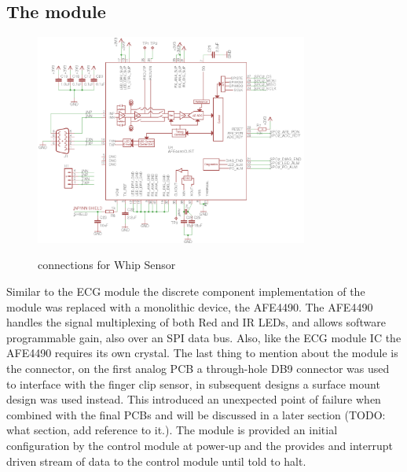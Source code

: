 \subsection{The  module}

\begin{figure}
	\begin{center}
		\label{fig:Rev5_SPO2}
		\includegraphics[scale=1,width=0.8\textwidth]{Images/Rev5_SPO2.png} 
		\caption{ connections for Whip Sensor}
	\end{center}
\end{figure}
Similar to the ECG module the discrete component implementation of the  module was replaced with a monolithic device, the AFE4490. The AFE4490 handles the signal multiplexing of both Red and IR LEDs, and allows software programmable gain, also over an SPI data bus. Also, like the ECG module IC the AFE4490 requires its own crystal. The last thing to mention about the  module is the connector, on the first analog PCB a through-hole DB9 connector was used to interface with the finger clip sensor, in subsequent designs a surface mount design was used instead. This introduced an unexpected point of failure when combined with the final PCBs and will be discussed in a later section (TODO: what section, add reference to it.). The  module is provided an initial configuration by the control module at power-up and the provides and interrupt driven stream of data to the control module until told to halt.

